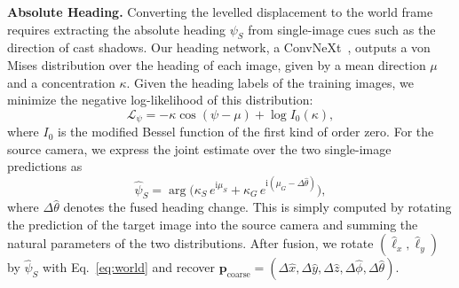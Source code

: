 \noindent\textbf{Absolute Heading.}
Converting the levelled displacement to the world frame requires extracting the absolute heading $\psi_S$ from single-image cues such as the direction of cast shadows. Our heading network, a ConvNeXt~\citep{liu2022convnet}, outputs a von Mises distribution over the heading of each image, given by a mean direction $\mu$ and a concentration $\kappa$. Given the heading labels of the training images, we minimize the negative log-likelihood of this distribution:
\begin{equation}
\mathcal{L}_{\psi}=-\kappa\cos(\psi-\mu)+\log I_0(\kappa),
\label{eq:vm}
\end{equation}
where $I_0$ is the modified Bessel function of the first kind of order zero. For the source camera, we express the joint estimate over the two single-image predictions as
\begin{equation}
\hat\psi_S=\arg\bigl(\kappa_S\,e^{\mathrm{i}\mu_S}+\kappa_G\,e^{\mathrm{i}(\mu_G-\Delta\hat\theta)}\bigr),
\label{eq:absheading}
\end{equation}
where $\Delta\hat\theta$ denotes the fused heading change. This is simply computed by rotating the prediction of the target image into the source camera and summing the natural parameters of the two distributions. After fusion, we rotate $(\hat\ell_x,\hat\ell_y)$ by $\hat\psi_S$ with Eq.~\eqref{eq:world} and recover $\mathbf{p}_{\text{coarse}}=(\Delta\hat x,\Delta\hat y,\Delta\hat z,\Delta\hat\phi,\Delta\hat\theta)$.

